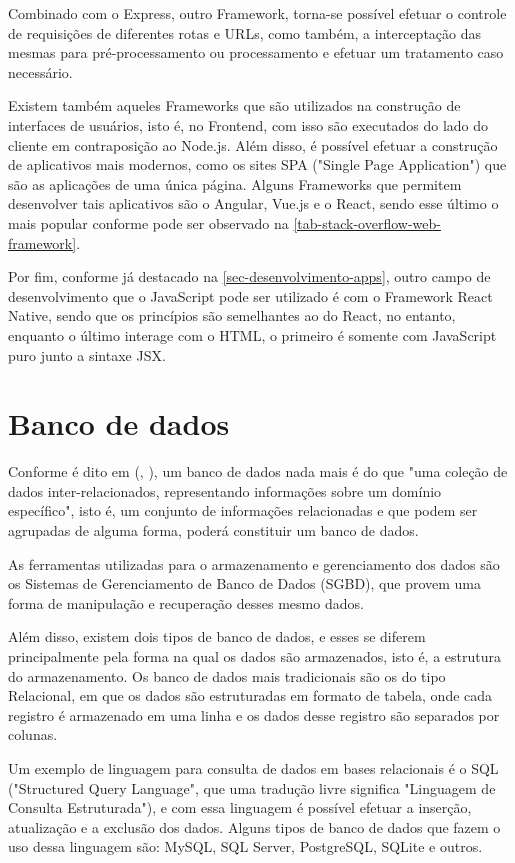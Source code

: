 Combinado com o Express, outro Framework, torna-se possível efetuar o controle de requisições de diferentes rotas e URLs, como também, a interceptação das mesmas para pré-processamento ou processamento e efetuar um tratamento caso necessário.

Existem também aqueles Frameworks que são utilizados na construção de interfaces de usuários, isto é, no Frontend, com isso são executados do lado do cliente em contraposição ao Node.js. Além disso, é possível efetuar a construção de aplicativos mais modernos, como os sites SPA ("Single Page Application") que são as aplicações de uma única página. Alguns Frameworks que permitem desenvolver tais aplicativos são o Angular, Vue.js e o React, sendo esse último o mais popular conforme pode ser observado na \autoref{tab-stack-overflow-web-framework}.

Por fim, conforme já destacado na \autoref{sec-desenvolvimento-apps}, outro campo de desenvolvimento que o JavaScript pode ser utilizado é com o Framework React Native, sendo que os princípios são semelhantes ao do React, no entanto, enquanto o último interage com o HTML, o primeiro é somente com JavaScript puro junto a sintaxe JSX.

\section{Banco de dados}

Conforme é dito em (\citeauthor{silberschatz2016sistema}, \citeyear{silberschatz2016sistema}), um banco de dados nada mais é do que "uma coleção de dados inter-relacionados, representando informações sobre um domínio específico", isto é, um conjunto de informações relacionadas e que podem ser agrupadas de alguma forma, poderá constituir um banco de dados.

As ferramentas utilizadas para o armazenamento e gerenciamento dos dados são os Sistemas de Gerenciamento de Banco de Dados (SGBD), que provem uma forma de manipulação e recuperação desses mesmo dados.

Além disso, existem dois tipos de banco de dados, e esses se diferem principalmente pela forma na qual os dados são armazenados, isto é, a estrutura do armazenamento. Os banco de dados mais tradicionais são os do tipo Relacional, em que os dados são estruturadas em formato de tabela, onde cada registro é armazenado em uma linha e os dados desse registro são separados por colunas.

Um exemplo de linguagem para consulta de dados em bases relacionais é o SQL ("Structured Query Language", que uma tradução livre significa "Linguagem de Consulta Estruturada"), e com essa linguagem é possível efetuar a inserção, atualização e a exclusão dos dados. Alguns tipos de banco de dados que fazem o uso dessa linguagem são: MySQL, SQL Server, PostgreSQL, SQLite e outros.

